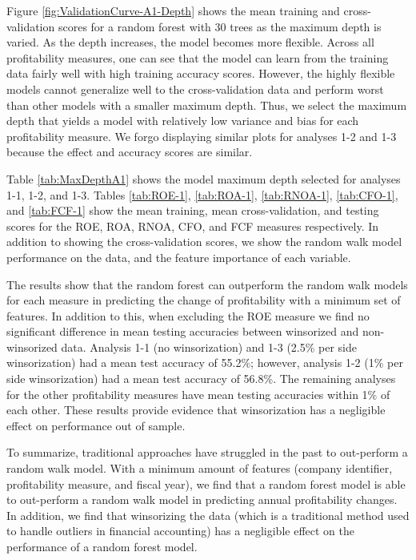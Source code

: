 Figure \ref{fig:ValidationCurve-A1-Depth} shows the mean training and cross-validation scores for a random forest with 30 trees as the maximum depth is varied.  As the depth increases, the model becomes more flexible. Across all profitability measures, one can see that the model can learn from the training data fairly well with high training accuracy scores. However, the highly flexible models cannot generalize well to the cross-validation data and perform worst than other models with a smaller maximum depth. Thus, we select the maximum depth that yields a model with relatively low variance and bias for each profitability measure. We forgo displaying similar plots for analyses 1-2 and 1-3 because the effect and accuracy scores are similar. 

Table \ref{tab:MaxDepthA1} shows the model maximum depth selected for analyses 1-1, 1-2, and 1-3. Tables \ref{tab:ROE-1},  \ref{tab:ROA-1}, \ref{tab:RNOA-1}, \ref{tab:CFO-1}, and \ref{tab:FCF-1} show the mean training, mean cross-validation, and testing scores for the ROE, ROA, RNOA, CFO, and FCF measures respectively. In addition to showing the cross-validation scores, we show the random walk model performance on the data,  and the feature importance of each variable. 

The results show that the random forest can outperform the random walk models for each measure in predicting the change of profitability with a minimum set of features. In addition to this, when excluding the ROE measure we find no significant difference in mean testing accuracies between winsorized and non-winsorized data. Analysis 1-1 (no winsorization) and 1-3 (2.5\% per side winsorization) had a mean test accuracy of 55.2\%; however, analysis 1-2 (1\% per side winsorization) had a mean test accuracy of 56.8\%. The remaining analyses for the other profitability measures have mean testing accuracies within 1\% of each other. These results provide evidence that winsorization has a negligible effect on performance out of sample.

To summarize,  traditional approaches have struggled in the past to out-perform a random walk model. With a minimum amount of features (company identifier, profitability measure, and fiscal year), we find that a random forest model is able to out-perform a random walk model in predicting annual profitability changes. In addition, we find that winsorizing the data (which is a traditional method used to handle outliers in financial accounting) has a negligible effect on the performance of a random forest model.

